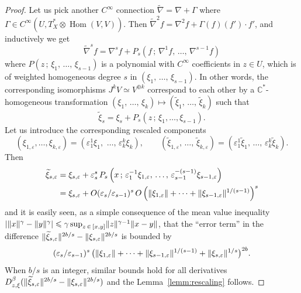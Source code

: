 \documentclass[AHL,Unicode,longabstracts,published]{cedram}
\DeclareMathOperator{\Hom}{Hom}
\DeclarePairedDelimiter{\abs}{\lvert}{\rvert}
\DeclarePairedDelimiter{\Abs}{\lVert}{\rVert}
\newcommand*\bC{\mathbb{C}}
\let\leq\leqslant
\begin{document}
\begin{proof}
Let us pick another $C^\infty$ connection $\widetilde\nabla= \nabla+\Gamma$ where $\Gamma\in C^\infty(U,T^*_X\otimes \Hom(V,V))$. Then
$\widetilde\nabla^2f=\nabla^2f+\Gamma(f)(f')\cdot f'$, and inductively we get
\[
\widetilde\nabla^sf=\nabla^sf+P_s\left(f\,;\,\nabla^1f,\,\dotsc,\,\nabla^{s-1}f\right)
\]
where $P(z\,;\,\xi_1,\,\dotsc,\,\xi_{s-1})$ is a polynomial with $C^\infty$ coefficients in $z\in U$, which is of weighted homogeneous degree $s$ in
$(\xi_1,\,\dotsc,\,\xi_{s-1})$. In other words, the corresponding isomorphisms
$J^kV\simeq V^{\oplus k}$ correspond to each other by a
$\bC^*$-homogeneous transformation
$(\xi_1,\,\dotsc,\,\xi_k)\mapsto (\widetilde\xi_1,\,\dotsc,\,\widetilde\xi_k)$ such that
\[
\widetilde\xi_s=\xi_s+P_s\left(z\,;\,\xi_1,\dotsc,\xi_{s-1}\right).
\]
Let us introduce the corresponding rescaled components
\[
(\xi_{1,\varepsilon},\dotsc,\xi_{k,\varepsilon})= \left(\varepsilon_1^1\xi_1,\,\,\dotsc,\,\varepsilon_k^k\xi_k\right),\qquad (\widetilde\xi_{1,\varepsilon},\,\dotsc,\,\widetilde\xi_{k,\varepsilon})= \left(\varepsilon_1^1\widetilde\xi_1,\,\dotsc,\,\varepsilon_k^k\widetilde\xi_k\right).
\]
Then
\begin{align*}
\widetilde\xi_{s,\varepsilon} &=
\xi_{s,\varepsilon}+
\varepsilon_s^s\,P_s\left(x\,;\,\varepsilon_1^{-1}\xi_{1,\varepsilon},\,\dotsc,\,
\varepsilon_{s-1}^{-(s-1)}\xi_{s-1,\varepsilon}\right)
\\
&=
\xi_{s,\varepsilon}+O(\varepsilon_s/\varepsilon_{s-1})^s\, O\left(\Abs{\xi_{1,\varepsilon}} +\dotsb+
\Abs{\xi_{s-1,\varepsilon}}^{1/(s-1)}\right)^s
\end{align*}
and it is easily seen, as a simple consequence of the mean value inequality
$\abs{\Abs{x}^\gamma-\Abs{y}^\gamma}\leq\gamma\sup_{z\,\in\,[x,y]}
\Abs{z}^{\gamma-1}\Abs{x-y}$, that the ``error term'' in the difference
$\Abs{\widetilde\xi_{s,\varepsilon}}^{2b/s}-\Abs{\xi_{s,\varepsilon}}^{2b/s}$ is bounded by
\[
(\varepsilon_s/\varepsilon_{s-1})^s\,
\big(\Abs{\xi_{1,\varepsilon}}+\cdots+
\Abs{\xi_{s-1,\varepsilon}}^{1/(s-1)}+
\Abs{\xi_{s,\varepsilon}}^{1/s}\big)^{2b}.
\]
When $b/s$ is an integer, similar bounds hold for all derivatives $D_{z,\xi}^\beta(\Abs{\widetilde\xi_{s,\varepsilon}}^{2b/s}-
\Abs{\xi_{s,\varepsilon}}^{2b/s})$ and the Lemma~\ref{lemm:rescaling} follows.
\end{proof}
\end{document}
